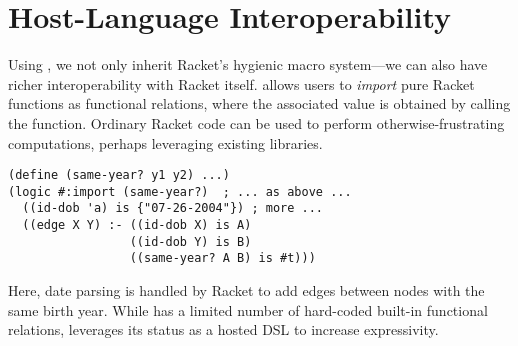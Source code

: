 \documentclass[dvipsnames,sigplan,screen,review,anonymous,acmthm,nonacm]{acmart}
\begin{document}
\section{Host-Language Interoperability}


Using \syntaxspec{}, we not only inherit Racket's hygienic macro system---we can
also have richer interoperability with Racket itself. \miniDusa{} allows users
to \emph{import} pure Racket functions as functional relations, where the
associated value is obtained by calling the function. Ordinary Racket code can
be used to perform otherwise-frustrating computations, perhaps leveraging
existing libraries.

\begin{verbatim}
(define (same-year? y1 y2) ...)
(logic #:import (same-year?)  ; ... as above ...
  ((id-dob 'a) is {"07-26-2004"}) ; more ...
  ((edge X Y) :- ((id-dob X) is A)
                 ((id-dob Y) is B)
                 ((same-year? A B) is #t)))
\end{verbatim}

Here, date parsing is handled by Racket to add edges between nodes
with the same birth year. While \Dusa{} has a limited number of
hard-coded built-in functional relations, \miniDusa{} leverages
its status as a hosted DSL to increase expressivity.


\clearpage


\end{document}
